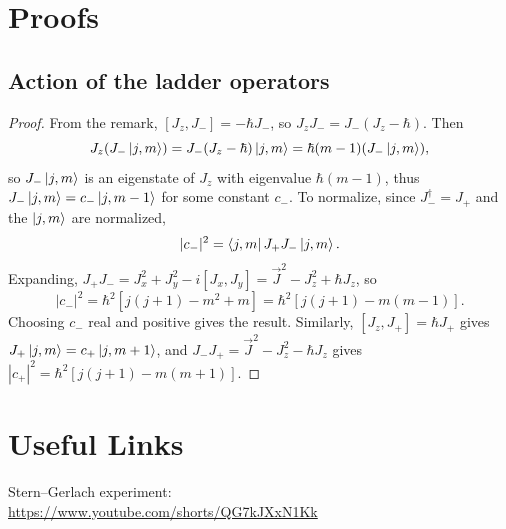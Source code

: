\documentclass{article}
\begin{document}
\section{Proofs}
\subsection{Action of the ladder operators}
\label{app:ladder-proof}
\begin{proof}
    From the remark, $[J_z, J_-] = -\hbar J_-$, so $J_zJ_- = J_-(J_z - \hbar)$. Then
    \begin{equation*}
        J_z(J_-\ket{j,m}) = J_-(J_z - \hbar)\ket{j,m} = \hbar(m-1)(J_-\ket{j,m}),
    \end{equation*}
    so $J_-\ket{j,m}$ is an eigenstate of $J_z$ with eigenvalue $\hbar(m-1)$, thus $J_-\ket{j,m} = c_-\ket{j,m-1}$ for some constant $c_-$. To normalize, since $J_-^\dagger = J_+$ and the $\ket{j,m}$ are normalized,
    \begin{equation*}
        |c_-|^2 = \bra{j,m}J_+J_-\ket{j,m}.
    \end{equation*}
    Expanding, $J_+J_- = J_x^2 + J_y^2 - i[J_x,J_y] = \vec{J}^2 - J_z^2 + \hbar J_z$, so
    \begin{equation*}
        |c_-|^2 = \hbar^2[j(j+1) - m^2 + m] = \hbar^2[j(j+1) - m(m-1)].
    \end{equation*}
    Choosing $c_-$ real and positive gives the result. Similarly, $[J_z, J_+] = \hbar J_+$ gives $J_+\ket{j,m} = c_+\ket{j,m+1}$, and $J_-J_+ = \vec{J}^2 - J_z^2 - \hbar J_z$ gives $|c_+|^2 = \hbar^2[j(j+1) - m(m+1)]$.
\end{proof}


\section{Useful Links}
\noindent Stern--Gerlach experiment:\\ \url{https://www.youtube.com/shorts/QG7kJXxN1Kk}
\end{document}
